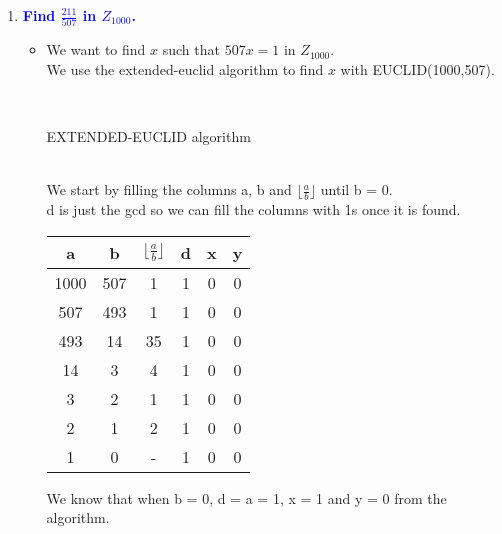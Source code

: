 \documentclass[11pt]{article}
\begin{document}
\begin{enumerate}
\item \textbf{\textcolor{blue}{Find $\frac{211}{507}$ in $Z_{1000}$.}}
    \begin{itemize}
        \item We want to find $x$ such that $507x = 1$ in $Z_{1000}$.
            \\ We use the extended-euclid algorithm to find $x$ with EUCLID(1000,507).
            \begin{algorithm}[H]
            \Indm{}\\
            \Indp
            \caption{EXTENDED-EUCLID algorithm}
            \end{algorithm}
            \\ We start by filling the columns a, b and ${\lfloor}\frac{a}{b}{\rfloor}$ until b = 0.
            \\ d is just the gcd so we can fill the columns with 1s once it is found. \\
            \begin{center}
            \begin{tabular}{| c | c | c | c | c | c |} 
            \hline
            a & b & ${\lfloor}\frac{a}{b}{\rfloor}$ & d & x & y \\
            \hline
            1000 & 507 & 1 & 1 & 0 & 0 \\
            507 & 493 & 1 & 1 & 0 & 0 \\
            493 & 14 & 35 & 1 & 0 & 0 \\
            14 & 3 & 4 & 1 & 0 & 0 \\
            3 & 2 & 1 & 1 & 0 & 0 \\
            2 & 1 & 2 & 1 & 0 & 0 \\
            1 & 0 & - & 1 & 0 & 0 \\
            \hline
            \end{tabular}
            \end{center}
            We know that when b = 0, d = a = 1, x = 1 and y = 0 from the algorithm. \\

\end{itemize}
\end{enumerate}
\end{document}
